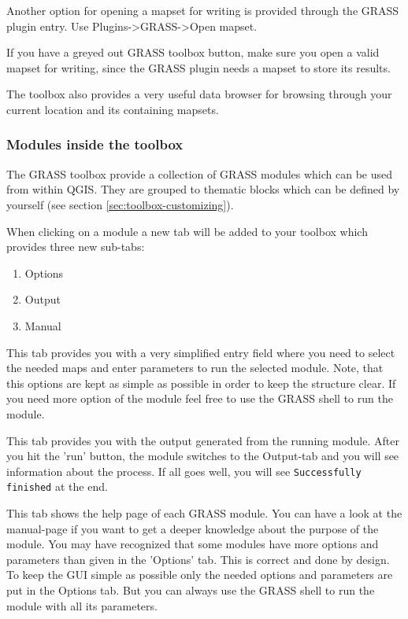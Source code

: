 Another option for opening a mapset for writing is provided through the 
GRASS plugin entry. Use Plugins->GRASS->Open mapset.
 
If you have a greyed out GRASS toolbox button, make sure you open a valid
mapset for writing, since the GRASS plugin needs a mapset to store its
results.

The toolbox also provides a very useful data browser for browsing through your
current location and its containing mapsets.


\subsubsection{Modules inside the toolbox} 

The GRASS toolbox provide a collection of GRASS modules which can be used
from within QGIS. They are grouped to thematic blocks which can be defined 
by yourself (see section \ref{sec:toolbox-customizing}). 

When clicking on a module a new tab will be added to your toolbox which
provides three new sub-tabs:
\begin{enumerate}
\item Options
\item Output 
\item Manual
\end{enumerate}


This tab provides you with a very simplified entry field where you need to 
select the needed maps and enter parameters to run the selected module.
Note, that this options are kept as simple as possible in order to keep
the structure clear. If you need more option of the module feel free to 
use the GRASS shell to run the module.


This tab provides you with the output generated from the running module. After you hit the 
'run' button, the module switches to the Output-tab and you will see information about 
the process. If all goes well, you will see \texttt{Successfully finished} at the end.


This tab shows the help page of each GRASS module. You can have a look at the manual-page
if you want to get a deeper knowledge about the purpose of the module.
You may have recognized that some modules have more options and parameters than given in
the 'Options' tab. This is correct and done by design. To keep the GUI simple as possible
only the needed options and parameters are put in the Options tab. But you can always 
use the GRASS shell to run the module with all its parameters.

